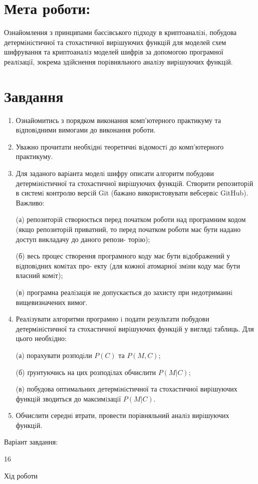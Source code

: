 
\newpage
    \section*{Мета роботи:}
    \qquad  Ознайомлення з принципами баєсiвського пiдходу в криптоаналiзi, побудова детермiнiстичної та стохастичної вирiшуючих функцiй для моделей схем шифрування та криптоаналiз моделей шифрiв за допомогою програмної реалiзацiї, зокрема здiйснення порiвняльного аналiзу вирiшуючих функцiй.

    \section*{Завдання}

    \begin{enumerate}
    \item  Ознайомитись з порядком виконання комп’ютерного практикуму та вiдповiдними вимогами до виконання роботи.
    \item Уважно прочитати необхiднi теоретичнi вiдомостi до комп’ютерного практикуму.
    \item Для заданого варiанта моделi шифру описати алгоритм побудови детермiнiстичної та стохастичної вирiшуючих функцiй. Створити репозиторiй в системi контролю версiй Git (бажано використовувати вебсервiс GitHub). Важливо:
    
    (а) репозиторiй створюється перед початком роботи над програмним кодом (якщо репозиторiй приватний, то перед початком роботи має бути надано доступ викладачу до даного репози- торiю);
        
    (б) весь процес створення програмного коду має бути вiдображений у вiдповiдних комiтах про- екту (для кожної атомарної змiни коду має бути власний комiт);
        
    (в) програмна реалiзацiя не допускається до захисту при недотриманнi вищевизначених вимог.
        
    \item Реалiзувати алгоритми програмно i подати результати побудови детермiнiстичної та стохастичної вирiшуючих функцiй у виглядi таблиць. Для цього необхiдно:
    
    (а) порахувати розподiли $P(C)$ та $P(M,C)$;
    
    (б) ґрунтуючись на цих розподiлах обчислити $P(M|C)$;
    
    (в) побудова оптимальних детермiнiстичної та стохастичної вирiшуючих функцiй зводиться до максимiзацiї $P(M|C)$.
    
    \item Обчислити середнi втрати, провести порiвняльний аналiз вирiшуючих функцiй.
    \end{enumerate}
    \begin{bf}
    Варіант завдання:
    \end{bf}
    16\\
\newpage
    \begin{center}
        \begin{Large}
            Хід роботи
        \end{Large}
    \end{center}
    
